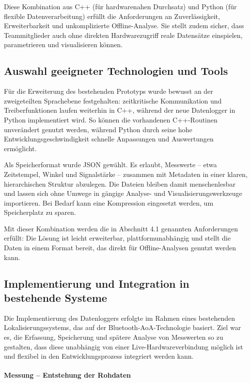 \documentclass[a4paper, 12pt]{article} %
\begin{document}
Diese Kombination aus C++ (für hardwarenahen Durchsatz) und Python (für flexible Daten­verarbeitung) erfüllt die Anforderungen 
an Zuverlässigkeit, Erweiterbarkeit und unkomplizierte Offline-Analyse. Sie stellt zudem sicher, dass Teammitglieder auch ohne direkten 
Hardwarezugriff reale Datensätze einspielen, parametrieren und visualisieren können.

\subsection{Auswahl geeigneter Technologien und Tools}
Für die Erweiterung des bestehenden Prototyps wurde bewusst an der zweigeteilten Sprachebene festgehalten: 
zeitkritische Kommunikation und Treiberfunktionen laufen weiterhin in C++, während der neue Datenlogger in Python 
implementiert wird. So können die vorhandenen C++-Routinen unverändert genutzt werden, während Python durch seine hohe 
Entwicklungsgeschwindigkeit schnelle Anpassungen und Auswertungen ermöglicht.

Als Speicherformat wurde \ac{JSON} gewählt. Es erlaubt, Messwerte – etwa Zeitstempel, Winkel und 
Signalstärke – zusammen mit Metadaten in einer klaren, hierarchischen Struktur abzulegen. Die Dateien bleiben damit menschenlesbar 
und lassen sich ohne Umwege in gängige Analyse- und Visualisierungswerkzeuge importieren. Bei Bedarf kann eine Kompression eingesetzt werden, 
um Speicherplatz zu sparen.

Mit dieser Kombination werden die in Abschnitt 4.1 genannten Anforderungen erfüllt: Die Lösung ist leicht erweiterbar, 
plattform­unabhängig und stellt die Daten in einem Format bereit, das direkt für Offline-Analysen genutzt werden kann.

\subsection{Implementierung und Integration in bestehende Systeme}

Die Implementierung des Datenloggers erfolgte im Rahmen eines bestehenden Lokalisierungssystems, das auf der Bluetooth-\ac{AoA}-Technologie 
basiert. Ziel war es, die Erfassung, Speicherung und spätere Analyse von Messwerten so zu gestalten, dass diese unabhängig
von einer Live-Hardwareverbindung möglich ist und flexibel in den Entwicklungsprozess integriert werden kann.

\paragraph{Messung – Entstehung der Rohdaten}
\end{document}
